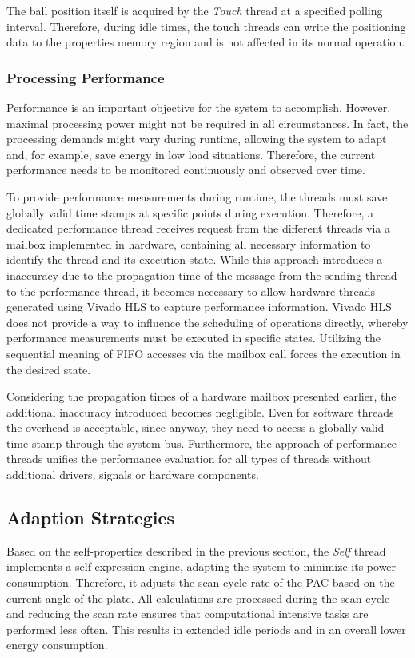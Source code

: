 The ball position itself is acquired by the \emph{Touch} thread at a specified
polling interval. Therefore, during idle times, the touch threads can write
the positioning data to the properties memory region and is not affected in
its normal operation.

\subsubsection{Processing Performance}
\label{sssec:processing}
Performance is an important objective for the system to accomplish. However,
maximal processing power might not be required in all circumstances. In fact,
the processing demands might vary during runtime, allowing the system to adapt
and, for example, save energy in low load situations. Therefore, the current
performance needs to be monitored continuously and observed over time.

To provide performance measurements during runtime, the threads must save
globally valid time stamps at specific points during execution. Therefore, a
dedicated performance thread receives request from the different threads via a
mailbox implemented in hardware, containing all necessary information to
identify the thread and its execution state. While this approach introduces a
inaccuracy due to the propagation time of the message from the sending thread
to the performance thread, it becomes necessary to allow hardware threads
generated using Vivado HLS to capture performance information. Vivado HLS does
not provide a way to influence the scheduling of operations directly, whereby
performance measurements must be executed in specific states. Utilizing the
sequential meaning of \ac{FIFO} accesses via the mailbox call forces the execution in the desired state.

Considering the propagation times of a hardware mailbox presented earlier, the
additional inaccuracy introduced becomes negligible. Even for software threads
the overhead is acceptable, since anyway, they need to access a globally valid
time stamp through the system bus. Furthermore, the approach of performance
threads unifies the performance evaluation for all types of threads without
additional drivers, signals or hardware components.

\subsection{Adaption Strategies}
Based on the self-properties described in the previous section, the
\emph{Self} thread implements a self-expression engine, adapting the system to
minimize its power consumption. Therefore, it adjusts the scan cycle rate of
the \ac{PAC} based on the current angle of the plate. All calculations are
processed during the scan cycle and reducing the scan rate ensures that
computational intensive tasks are performed less often. This results in
extended idle periods and in an overall lower energy consumption.

